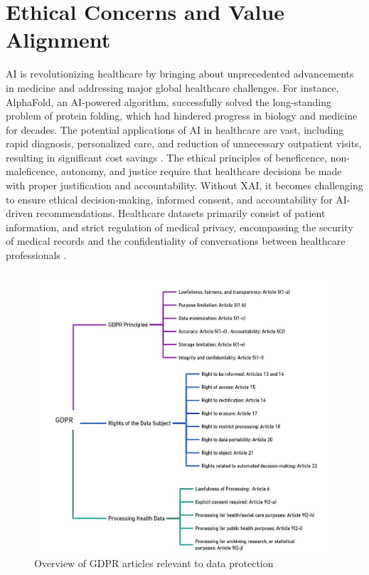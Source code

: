 \documentclass{article}
\begin{document}
\section{Ethical Concerns and Value Alignment}
AI is revolutionizing healthcare by bringing about unprecedented advancements in medicine and addressing major global healthcare challenges. For instance, AlphaFold, an AI-powered algorithm, successfully solved the long-standing problem of protein folding, which had hindered progress in biology and medicine for decades. The potential applications of AI in healthcare are vast, including rapid diagnosis, personalized care, and reduction of unnecessary outpatient visits, resulting in significant cost savings \cite{nussinov2022alphafold}.
The ethical principles of beneficence, non-maleficence, autonomy, and justice require that healthcare decisions be made with proper justification and accountability. Without XAI, it becomes challenging to ensure ethical decision-making, informed consent, and accountability for AI-driven recommendations. Healthcare datasets primarily consist of patient information, and strict regulation of medical privacy, encompassing the security of medical records and the confidentiality of conversations between healthcare professionals \cite{keshta2021security,si2021deep}. 
\begin{figure}[!htb]
\centering
\includegraphics[scale=0.75]{GDPR.jpg}
\caption{\label{fig:1.8}Overview of GDPR articles relevant to data protection}
\end{figure}
\end{document}
